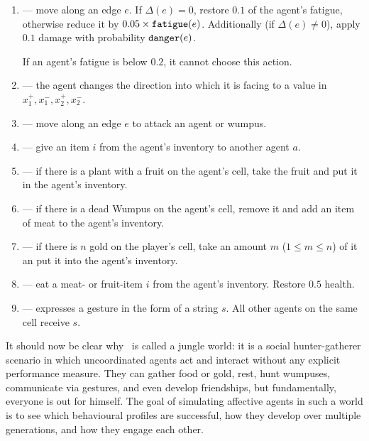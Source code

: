 \begin{definition}
\begin{description}
	\begin{enumerate}\label{lst:agentBehavior}
		\item[\action{move}] --- move along an edge $e$. If $\Delta(e) = 0$, restore $0.1$ of the agent's fatigue, otherwise reduce it by $0.05 \times \mathtt{fatigue}(e)$. Additionally (if $\Delta(e) \neq 0$), apply $0.1$ damage with probability $\mathtt{danger}(e)$.
		
		If an agent's fatigue is below $0.2$, it cannot choose this action.
		
		\item[\action{rotate}] --- the agent changes the direction into which it is facing to a value in ${x_1^+,x_1^-,x_2^+,x_2^-}$.
		
		\item[\action{attack}] --- move along an edge $e$ to attack an agent or wumpus.
		
		\item[\action{give}] --- give an item $i$ from the agent's inventory to another agent $a$.
		
		\item[\action{gather}] --- if there is a plant with a fruit on the agent's cell, take the fruit and put it in the agent's inventory.
		
		\item[\action{butcher}] --- if there is a dead Wumpus on the agent's cell, remove it and add an item of meat to the agent's inventory.
		
		\item[\action{collect}] --- if there is $n$ gold on the player's cell, take an amount $m$ ($1 \leq m \leq n$) of it an put it into the agent's inventory.
		
		\item[\action{eat}] --- eat a meat- or fruit-item $i$ from the agent's inventory. Restore $0.5$ health.
		
		\item[\action{gesture}] --- expresses a gesture in the form of a string $s$. All other agents on the same cell receive $s$.
	\end{enumerate}
	
\end{description}
\end{definition}

It should now be clear why \wjun\ is called a jungle world: it is a social hunter-gatherer scenario in which uncoordinated agents act and interact without any explicit performance measure. They can gather food or gold, rest, hunt wumpuses, communicate via gestures, and even develop friendships, but fundamentally, everyone is out for himself. The goal of simulating affective agents in such a world is to see which behavioural profiles are successful, how they develop over multiple generations, and how they engage each other.

